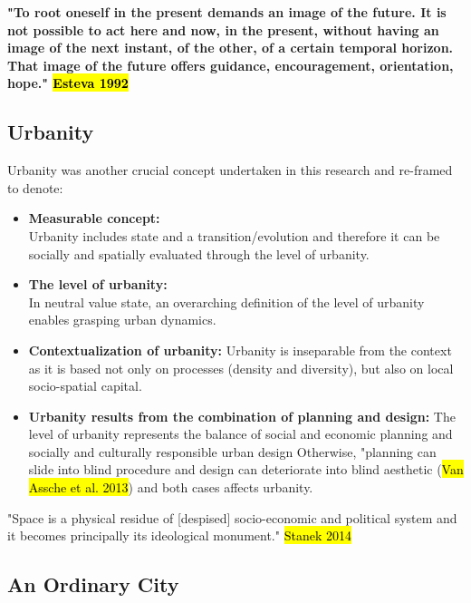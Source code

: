 \documentclass[11pt]{report}
\begin{document}
\textbf{"To root oneself in the present demands an image of the future. It is not possible to act here and now, in the present, without having an image of the next instant, of the other, of a certain temporal horizon. That image of the future offers guidance, encouragement, orientation, hope." \hl{Esteva 1992}}

\subsection{Urbanity}

Urbanity was another crucial concept undertaken in this research and re-framed to denote:

\begin{itemize}
\item \textbf{Measurable concept:}
\\
Urbanity includes state and a transition/evolution and therefore it can be socially and spatially evaluated through the level of urbanity.

\item \textbf{The level of urbanity:}
\\
In neutral value state, an overarching definition of the level of urbanity enables grasping urban dynamics.

\item \textbf{Contextualization of urbanity:}
Urbanity is inseparable from the context as it is based not only on processes (density and diversity), but also  on local socio-spatial capital.

\item \textbf{Urbanity results from the combination of planning and design:}
The level of urbanity represents the balance of social and economic planning and socially and culturally responsible urban design
Otherwise, "planning can slide into blind procedure and design can deteriorate into blind aesthetic
(\hl{Van Assche et al. 2013}) and both cases affects urbanity.
\end{itemize}

"Space is a physical residue of [despised] socio-economic and political system and it becomes principally its ideological monument." \hl{Stanek 2014}

\subsection{An Ordinary City}
\end{document}
